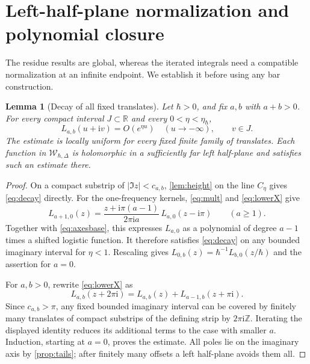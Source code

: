 \documentclass[11pt]{article}
\numberwithin{equation}{section}
\newtheorem{lemma}[lemma]{Lemma}
\theoremstyle{definition}
\theoremstyle{remark}
\newcommand{\Z}{\mathbb Z}
\newcommand{\R}{\mathbb R}
\newcommand{\ii}{\mathrm i}
\newcommand{\calW}{\mathcal W}
\newcommand{\qh}{\hbar}
\begin{document}
\section{Left-half-plane normalization and polynomial closure}\label{sec:decay}

The residue results are global, whereas the iterated integrals need a
compatible normalization at an infinite endpoint. We establish it before
using any bar construction.

\begin{lemma}[Decay of all fixed translates]\label{lem:decay}
Let $\qh>0$, and fix $a,b$ with $a+b>0$. For every compact interval
$J\subset\R$ and every $0<\eta<\eta_{\qh}$,
\begin{equation}\label{eq:decay}
 L_{a,b}(u+\ii v)=O(e^{\eta u})\quad(u\longrightarrow-\infty),
 \qquad v\in J.
\end{equation}
The estimate is locally uniform for every fixed finite family of translates.
Each function in $\calW_{\qh,\Delta}$ is holomorphic in a sufficiently far
left half-plane and satisfies such an estimate there.
\end{lemma}
\begin{proof}
On a compact substrip of $|\Im z|<c_{a,b}$, \cref{lem:height} on the line
$C_\eta$ gives \eqref{eq:decay} directly.
For the one-frequency kernels, \eqref{eq:mult} and
\eqref{eq:lowerX} give
\begin{equation}\label{eq:axisrecursion}
 L_{a+1,0}(z)=\frac{z+\ii\pi(a-1)}{2\pi\ii a}\,
 L_{a,0}(z-\ii\pi)\qquad(a\geq1).
\end{equation}
Together with \eqref{eq:axesbase}, this expresses $L_{a,0}$ as a polynomial
of degree $a-1$ times a shifted logistic function. It therefore satisfies
\eqref{eq:decay} on any bounded imaginary interval for $\eta<1$.
Rescaling gives $L_{0,b}(z)=\qh^{-1}L_{b,0}(z/\qh)$ and the assertion
for $a=0$.

For $a,b>0$, rewrite \eqref{eq:lowerX} as
\[
 L_{a,b}(z+2\pi\ii)=L_{a,b}(z)+L_{a-1,b}(z+\pi\ii).
\]
Since $c_{a,b}>\pi$, any fixed bounded imaginary interval can be covered by
finitely many translates of compact substrips of the defining strip by
$2\pi\ii\Z$. Iterating the displayed identity reduces its additional terms
to the case with smaller $a$. Induction, starting at $a=0$, proves the
estimate. All poles lie on the imaginary axis by \cref{prop:tails}; after
finitely many offsets a left half-plane avoids them all.
\end{proof}
\end{document}
